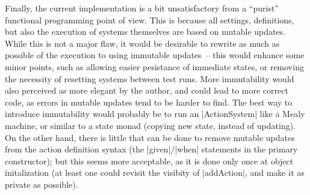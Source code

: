 Finally, the current implementation is a bit unsatisfactory from a \enquote{purist} functional
programming point of view. This is because all settings, definitions, but also the execution of
systems themselves are based on mutable updates. While this is not a major flaw, it would be
desirable to rewrite as much as possible of the execution to using immutable updates~-- this would
enhance some minor points, such as allowing easier pesistance of immediate states, or removing the
necessity of resetting systems between test runs. More immutability would also perceived as more
elegant by the author, and could lead to more correct code, as errors in mutable updates tend to be
harder to find. The best way to introduce immutability would probably be to run an |ActionSystem|
like a Mealy machine, or similar to a state monad (copying new state, instead of updating). On the
other hand, there is little that can be done to remove mutable updates from the action definition
syntax (the |given|\slash |when| statements in the primary constructor); but this seems more
acceptable, as it is done only once at object initalization (at least one could revisit the visibity
of |addAction|, and make it as private as possible).

